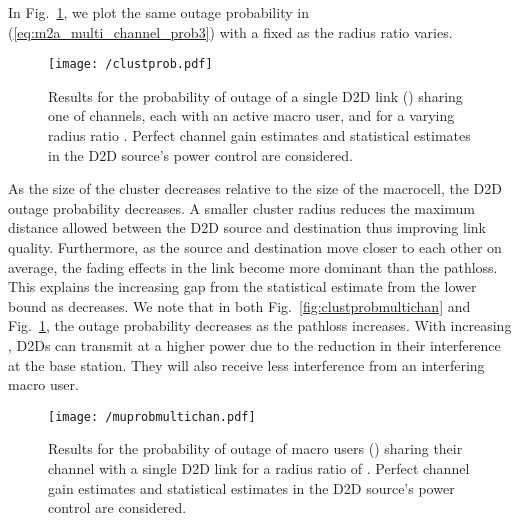 \documentclass[10pt, final, journal, letterpaper,oneside, twocolumn]{IEEEtran}
\begin{document}
In Fig.~\ref{fig:clustprob}, we plot the same outage probability in (\ref{eq:m2a_multi_channel_prob3}) with a fixed  as the radius ratio  varies.
\begin{figure}[htp]
\center
 \texttt{[image: /clustprob.pdf]}
  \caption[]{Results for the probability of outage of a single D2D link () sharing one of  channels, each with an active macro user, and for a varying radius ratio . Perfect channel gain estimates and statistical estimates in the D2D source's power control are considered. }
  \label{fig:clustprob}
\end{figure}
As the size of the cluster decreases relative to the size of the macrocell, the D2D outage probability decreases.  A smaller cluster radius reduces the maximum distance allowed between the D2D source and destination thus improving link quality.  Furthermore, as the source and destination move closer to each other on average, the fading effects in the link become more dominant than the pathloss.  This explains the increasing gap from the statistical estimate from the lower bound as  decreases.  We note that in both Fig.~\ref{fig:clustprobmultichan} and Fig.~\ref{fig:clustprob}, the outage probability decreases as the pathloss increases.  With increasing , D2Ds can transmit at a higher power due to the reduction in their interference at the base station.  They will also receive less interference from an interfering macro user.  
\begin{figure}[htp]
\center
 \texttt{[image: /muprobmultichan.pdf]}
  \caption[]{Results for the probability of outage of  macro users () sharing their channel with a single D2D link for a radius ratio of . Perfect channel gain estimates and statistical estimates in the D2D source's power control are considered. }
  \label{fig:MUprobmultichan}
\end{figure}
\end{document}

